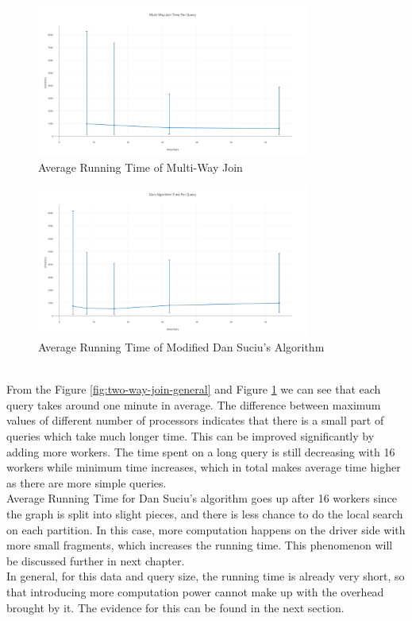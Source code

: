 \begin{figure}[h!]
  \caption{Average Running Time of Multi-Way Join}
  \label{fig:multi-way-general}
  \centering
    \includegraphics[width=0.8\textwidth]{img/Multi-Way-Join-General}
\end{figure}
\begin{figure}[h!]
  \caption{Average Running Time of Modified Dan Suciu's Algorithm}
  \label{fig:Dan-Algorithm-General}
  \centering
    \includegraphics[width=0.8\textwidth]{img/Dan-Algorithm-General}
\end{figure}
\\From the Figure \ref{fig:two-way-join-general} and Figure \ref{fig:multi-way-general} we can see that each query takes around one minute in average. The difference between maximum values of different number of processors indicates that there is a small part of queries which take much longer time. This can be improved significantly by adding more workers. The time spent on a long query is still decreasing with 16 workers while minimum time increases, which in total makes average time higher as there are more simple queries. 
\\Average Running Time for Dan Suciu's algorithm goes up after 16 workers since the graph is split into slight pieces, and there is less chance to do the local search on each partition. In this case, more computation happens on the driver side with more small fragments, which increases the running time. This phenomenon will be discussed further in next chapter.
\\In general, for this data and query size, the running time is already very short, so that introducing more computation power cannot make up with the overhead brought by it. The evidence for this can be found in the next section.
